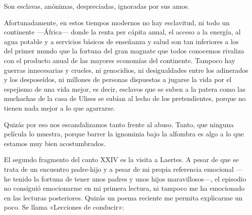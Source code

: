 Son esclavas, anónimas, despreciadas, ignoradas por sus amos.

Afortunadamente, en estos tiempos modernos no hay esclavitud, ni todo un continente ---África--- donde la renta per cápita anual, el acceso a la energía, al agua potable y a servicios básicos de enseñanza y salud son tan inferiores a los del primer mundo que la fortuna del gran magnate que todos conocemos rivaliza con el producto anual de las mayores economías del continente. Tampoco hay guerras innecesarias y crueles, ni genocidios, ni desigualdades entre los adinerados y los desposeídos, ni millones de personas dispuestas a jugarse la vida por el espejismo de una vida mejor, es decir, esclavos que se suben a la patera como las muchachas de la casa de Ulises se subían al lecho de los pretendientes, porque no tienen nada mejor a lo que agarrarse.

Quizás por eso nos escandalizamos tanto frente al abuso. Tanto, que ninguna película lo muestra, porque barrer la ignominia bajo la alfombra es algo a lo que estamos muy bien acostumbrados.

El segundo fragmento del canto XXIV es la visita a Laertes. A pesar de que se trata de un encuentro padre-hijo y a pesar de mi propia referencia emocional ---he tenido la fortuna de tener unos padres y unos hijos maravillosos---, el episodio no consiguió emocionarme en mi primera lectura, ni tampoco me ha emocionado en las lecturas posteriores. Quizás un poema reciente me permita explicarme un poco. Se llama «Lecciones de conducir»:


